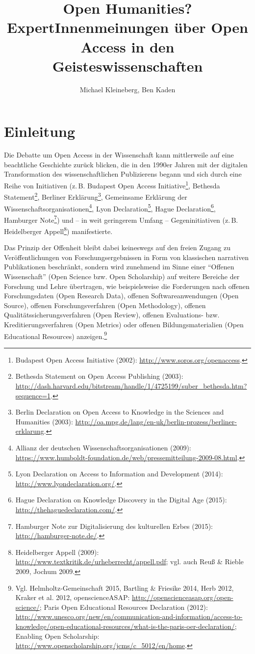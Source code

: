 \documentclass[a4paper,
fontsize=11pt,
oneside,
numbers=noperiodatend,
parskip=half-,
bibliography=totoc,
final
]{scrartcl}
\title{\LARGE{Open Humanities? ExpertInnenmeinungen über Open Access in den Geisteswissenschaften}} %
\author{Michael Kleineberg, Ben Kaden} %
\date{}
\begin{document}
\maketitle
\thispagestyle{fancyplain} 


\section{Einleitung}\label{einleitung}

Die Debatte um Open Access in der Wissenschaft kann mittlerweile auf
eine beachtliche Geschichte zurück blicken, die in den 1990er Jahren mit
der digitalen Transformation des wissenschaftlichen Publizierens begann
und sich durch eine Reihe von Initiativen (z.\,B. Budapest Open Access
Initiative\footnote{Budapest Open Access Initiative (2002):
  \url{http://www.soros.org/openaccess}.}, Bethesda Statement\footnote{Bethesda
  Statement on Open Access Publishing (2003):
  \url{http://dash.harvard.edu/bitstream/handle/1/4725199/suber_bethesda.htm?sequence=1}.},
Berliner Erklärung\footnote{Berlin Declaration on Open Access to
  Knowledge in the Sciences and Humanities (2003):
  \url{http://oa.mpg.de/lang/en-uk/berlin-prozess/berliner-erklarung}.},
Gemeinsame Erklärung der Wissenschaftsorganisationen\footnote{Allianz
  der deutschen Wissenschaftsorganisationen (2009):
  \url{https://www.humboldt-foundation.de/web/pressemitteilung-2009-08.html}.},
Lyon Declaration\footnote{Lyon Declaration on Access to Information and
  Development (2014): \url{http://www.lyondeclaration.org/}.}, Hague
Declaration\footnote{Hague Declaration on Knowledge Discovery in the
  Digital Age (2015): \url{http://thehaguedeclaration.com/}.}, Hamburger
Note\footnote{Hamburger Note zur Digitalisierung des kulturellen Erbes
  (2015): \url{http://hamburger-note.de/}.}) und -- in weit geringerem
Umfang -- Gegeninitiativen (z.\,B. Heidelberger Appell\footnote{Heidelberger
  Appell (2009): \url{http://www.textkritik.de/urheberrecht/appell.pdf};
  vgl. auch Reuß \& Rieble 2009, Jochum 2009.}) manifestierte.

Das Prinzip der Offenheit bleibt dabei keineswegs auf den freien Zugang
zu Veröffentlichungen von Forschungsergebnissen in Form von klassischen
narrativen Publikationen beschränkt, sondern wird zunehmend im Sinne
einer \enquote{Offenen Wissenschaft} (Open Science bzw. Open
Scholarship) auf weitere Bereiche der Forschung und Lehre übertragen,
wie beispielsweise die Forderungen nach offenen Forschungsdaten (Open
Research Data), offenen Softwareanwendungen (Open Source), offenen
Forschungsverfahren (Open Methodology), offenen
Qualitätssicherungsverfahren (Open Review), offenen Evaluations- bzw.
Kreditierungsverfahren (Open Metrics) oder offenen Bildungsmaterialien
(Open Educational Resources) anzeigen.\footnote{Vgl.
  Helmholtz-Gemeinschaft 2015, Bartling \& Friesike 2014, Herb 2012,
  Kraker et al. 2012, openscienceASAP:
  \url{http://openscienceasap.org/open-science/}; Paris Open Educational
  Resources Declaration (2012):
  \url{http://www.unesco.org/new/en/communication-and-information/access-to-knowledge/open-educational-resources/what-is-the-paris-oer-declaration/};
  Enabling Open Scholarship:
  \url{http://www.openscholarship.org/jcms/c_5012/en/home}.}
\end{document}

